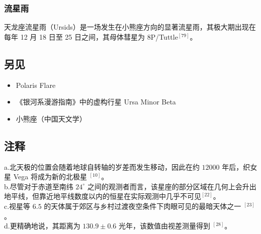 \subsubsection{流星雨}  
天龙座流星雨（Ursids）是一场发生在小熊座方向的显著流星雨，其极大期出现在每年 12 月 18 日至 25 日之间，其母体彗星为 8P/Tuttle$^{[79]}$。
\subsection{另见}  
\begin{itemize}
\item Polaris Flare  
\item 《银河系漫游指南》中的虚构行星 Ursa Minor Beta  
\item 小熊座（中国天文学）
\end{itemize}
\subsection{注释}  
a.北天极的位置会随着地球自转轴的岁差而发生移动，因此在约 $12000$ 年后，织女星 Vega 将成为新的北极星 $^{[10]}$。\\  
b.尽管对于赤道至南纬 $24^\circ$ 之间的观测者而言，该星座的部分区域在几何上会升出地平线，但靠近地平线数度以内的恒星在实际观测中几乎不可见$^{[22]}$。 \\ 
c.视星等 $6.5$ 的天体属于郊区与乡村过渡夜空条件下肉眼可见的最暗天体之一 $^{[23]}$。\\  
d.更精确地说，其距离为 $130.9\pm0.6$ 光年，该数值由视差测量得到 $^{[28]}$。
